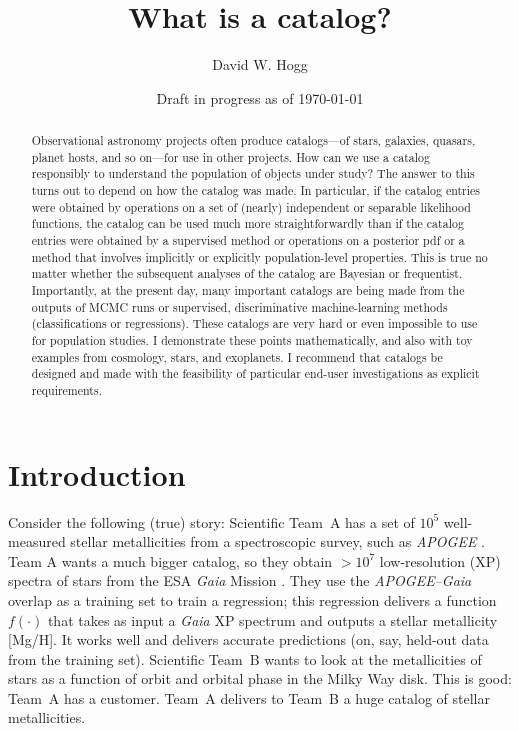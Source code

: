 \documentclass[10pt]{article}
\title{\textbf{What is a catalog?}}
\author{David W. Hogg}
\date{Draft in progress as of \today}
\begin{document}
\maketitle\thispagestyle{empty}

\begin{abstract}\noindent
    Observational astronomy projects often produce catalogs---of stars, galaxies, quasars, planet hosts, and so on---for use in other projects.
    How can we use a catalog responsibly to understand the population of objects under study?
    The answer to this turns out to depend on how the catalog was made.
    In particular, if the catalog entries were obtained by operations on a set of (nearly) independent or separable likelihood functions, the catalog can be used much more straightforwardly than if the catalog entries were obtained by a supervised method or operations on a posterior pdf or a method that involves implicitly or explicitly population-level properties.
    This is true no matter whether the subsequent analyses of the catalog are Bayesian or frequentist.
    Importantly, at the present day, many important catalogs are being made from the outputs of MCMC runs or supervised, discriminative machine-learning methods (classifications or regressions).
    These catalogs are very hard or even impossible to use for population studies.
    I demonstrate these points mathematically, and also with toy examples from cosmology, stars, and exoplanets.
    I recommend that catalogs be designed and made with the feasibility of particular end-user investigations as explicit requirements.
\end{abstract}

\section{Introduction}

Consider the following (true) story:
Scientific Team~A has a set of $10^5$ well-measured stellar metallicities from a spectroscopic survey, such as \textsl{APOGEE} \cite{apogee}.
Team A wants a much bigger catalog, so they obtain $>10^7$ low-resolution (XP) spectra of stars from the ESA \textsl{Gaia} Mission \cite{gaiadr3}.
They use the \textsl{APOGEE--Gaia} overlap as a training set to train a regression; this regression delivers a function $f(\cdot)$ that takes as input a \textsl{Gaia} XP spectrum and outputs a stellar metallicity [Mg/H].
It works well and delivers accurate predictions (on, say, held-out data from the training set).
Scientific Team~B wants to look at the metallicities of stars as a function of orbit and orbital phase in the Milky Way disk.
This is good: Team~A has a customer.
Team~A delivers to Team~B a huge catalog of stellar metallicities.
\end{document}
